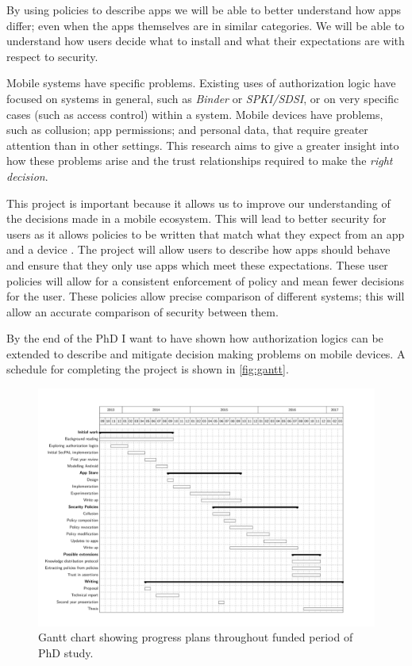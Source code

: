 \documentclass[a4paper,sfsidenotes]{%
  scrartcl%
}
\begin{document}
By using policies to describe apps we will be able to better understand how
apps differ; even when the apps themselves are in similar categories.  We will
be able to understand how users decide what to install and what their
expectations are with respect to security.

Mobile systems have specific problems.  Existing uses of authorization logic
have focused on systems in general, such as \emph{Binder} or \emph{SPKI/SDSI},
or on very specific cases (such as access control) within a system.  Mobile
devices have problems, such as collusion; app permissions; and personal data,
that require greater attention than in other settings.  This research aims to give
a greater insight into how these problems arise and the trust relationships
required to make the \emph{right decision}.


This project is important because it allows us to improve our understanding of
the decisions made in a mobile ecosystem.  This will lead to better security for users as it allows
policies to be written that match what they expect from an app and a device .
The project will allow users to describe how apps should
behave and ensure that they only use apps which meet these expectations.  These
user policies will allow for a consistent
enforcement of policy and mean fewer decisions for the user.  These policies allow
precise comparison of different systems; this will allow an accurate comparison
of security between them.

By the end of the PhD I want to have shown how authorization logics can be
extended to describe and mitigate decision making problems on mobile devices.
A schedule for completing the project is shown in \autoref{fig:gantt}.

\vfill
\begin{figure}
  \includegraphics[width=1.3\linewidth,angle=90]{gantt.pdf}
  \caption[Gantt chart.]{Gantt chart showing progress plans throughout funded period of PhD
  study.}\label{fig:gantt}
\end{figure}
\pagebreak


\appendix

\end{document}
